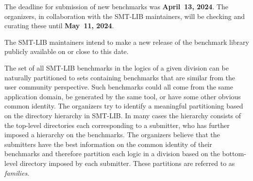 \documentclass[12pt]{article}
\begin{document}
The deadline for submission of new benchmarks was {\bf April~13, 2024}.
%
The organizers, in collaboration with the SMT-LIB maintainers, will be
checking and curating these until {\bf May~11, 2024}.

The SMT-LIB
maintainers intend to make a new release of the benchmark library
publicly available on or close to this date.

%
The set of all SMT-LIB benchmarks in the logics of a given division can be
naturally partitioned to sets containing benchmarks that are similar from the
user community perspective.
%
Such benchmarks could all come from the same
application domain, be generated by the same tool, or have some other
obvious common identity.
%
The organizers try to identify a meaningful partitioning based on the
directory hierarchy in SMT-LIB.  In many cases the hierarchy consists of
the top-level directories each corresponding to a submitter, who has
further imposed a hierarchy on the benchmarks.
%
The organizers believe that the submitters have the best information on the
common identity of their benchmarks and therefore partition each logic in a
division based on the bottom-level directory imposed by each submitter.  These
partitions are referred to as \emph{families}.
\end{document}

